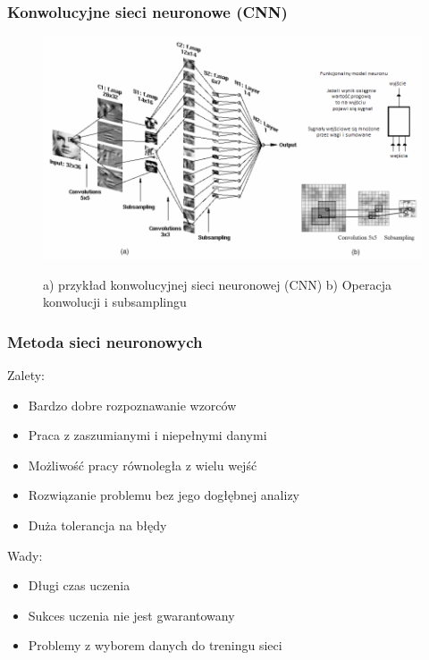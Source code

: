 \documentclass[xcolor=table]{beamer}
\begin{document}
\begin{frame}
  \frametitle{Konwolucyjne sieci neuronowe (CNN)}

	\begin{figure}
    		 {\includegraphics[scale=0.4]{cnn.png}}
		\caption{a) przykład konwolucyjnej sieci neuronowej (CNN) b) Operacja konwolucji i subsamplingu}
	\end{figure}

\end{frame}

\begin{frame}
  \frametitle{Metoda sieci neuronowych}

 { 
	Zalety:
	\begin{itemize}
		\item Bardzo dobre rozpoznawanie wzorców
		\item Praca z zaszumianymi i niepełnymi danymi
		\item Możliwość pracy równoległa z wielu wejść
		\item Rozwiązanie problemu bez jego dogłębnej analizy
		\item Duża tolerancja na błędy
	\end{itemize}
}

\vspace{10pt}
 {
	Wady:
	\begin{itemize}
	\item  Długi czas uczenia
	\item Sukces uczenia nie jest gwarantowany
	\item Problemy z wyborem danych do treningu sieci
	\end{itemize}
}
\end{frame}
\end{document}
